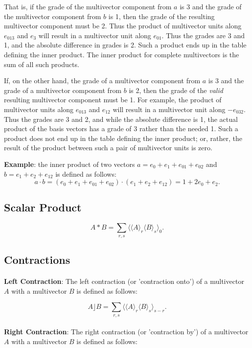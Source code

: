 \documentclass{article}
\begin{document}
That is, if the grade of the multivector component from $a$ is 3 and the grade of the multivector component from $b$ is 1, 
then the grade of the resulting multivector component must be 2. Thus the product of multivector units along $e_{013}$ and $e_{3}$
will result in a multivector unit along $e_{01}$. Thus the grades are 3 and 1, and the absolute difference in grades is 2. Such a product
ends up in the table defining the inner product. The inner product for complete multivectors is the sum of all such products. 

If, on the other hand, the grade of a multivector component from $a$ is 3 and the grade of a multivector component from $b$ is 2, 
then the grade of the \textit{valid} resulting multivector component must be 1. 
For example, the product of multivector units along $e_{013}$ and $e_{12}$ will result in a multivector unit 
along $-e_{032}$. Thus the grades are 3 and 2, and while the absolute difference is 1, the actual
product of the basis vectors has a grade of 3 rather than the needed 1. Such a product does not end up in the table defining the inner product; 
or, rather, the result of the product between such a pair of multivector units is zero.

\textbf{Example}: the inner product of two vectors $a = e_0 + e_1 + e_{01} + e_{02}$ and $b = e_1 + e_2 + e_{12}$ 
is defined as follows: $$a \cdot b = (e_0 + e_1 + e_{01} + e_{02}) \cdot (e_1 + e_2 + e_{12}) = 1 + 2e_0 + e_2.$$

\subsection{\textbf{Scalar Product}}
$$ A * B = \sum_{r,s} \langle \langle A \rangle_{r} \langle B \rangle_{s} \rangle_{0}.$$

\subsection{\textbf{Contractions}}

\paragraph{}\textbf{Left Contraction}: The left contraction (or 'contraction onto') of a multivector $A$ with a multivector $B$ is defined as follows:

$$A\rfloor B = \sum_{r,s} \langle \langle A \rangle_{r} \langle B \rangle_{s} \rangle_{s - r}.$$

\paragraph{}\textbf{Right Contraction}: The right contraction (or 'contraction by') of a multivector $A$ with a multivector $B$ is defined as follows:
\end{document}
